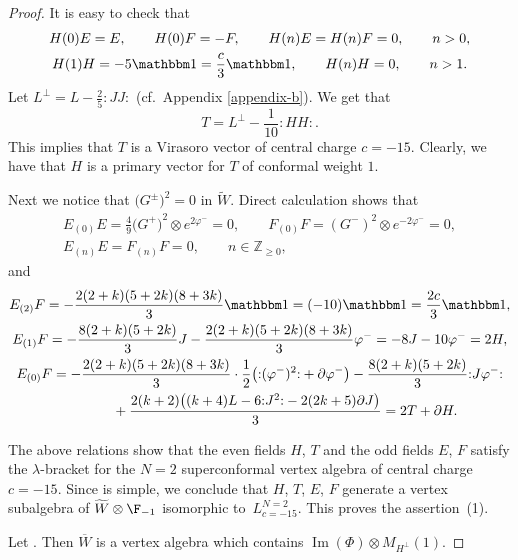 \begin{proof}


It is easy to check that
\begin{gather*}
 H(0) E = E, \qquad H(0) F =-F, \qquad H(n) E = H(n) F =0, \qquad n >0, \\
 H(1) H = - 5 {\mathbbm 1} = \frac{c}{3} {\mathbbm 1},\qquad H(n) H =0, \qquad n >1.
\end{gather*}
 Let $L^{\perp} = L- \frac{2}{5} {:}J J{:}$ (cf.\ Appendix \ref{appendix-b}). We get that
\[
 T = L^{\perp} -\frac{1}{10} {:}H H{:}.
 \]
This implies that $T$ is a Virasoro vector of central charge $c=-15$. Clearly, we have that $H$ is a primary vector for $T$ of conformal weight $1$.


 Next we notice that $\bigl(G^\pm \bigr)^2 =0$ in $\widetilde W$. Direct calculation shows that
 \begin{gather*}
 E_{(0)} E = \frac{4}{9} {\bigl( G^+ \bigr)}^2 \otimes e^{2 \varphi^-} =0, \qquad F_{(0)}F = {( G^-)}^2 \otimes e^{-2 \varphi^-} =0, \\
 E_{(n)} E = F_{(n)} F =0, \qquad n\in {\mathbb Z}_{\ge 0},
\end{gather*}
and
\begin{gather*}
	E_{(2)} F = -\frac{2 (2 + k)(5 + 2k)(8 + 3k)}{3} {\mathbbm 1} =(-10) {\mathbbm 1} = \frac{2 c}{3} {\mathbbm 1}, \\
E_{(1)} F = -\frac{ 8(2 + k)(5 + 2k)}{3} J - \frac{2 (2 + k)(5 + 2k)(8 + 3k)}{3} \varphi^- = -8 J - 10 \varphi^- = 2 H, \\
 E_{(0)} F = - \frac{2 (2 + k)(5 + 2k)(8 + 3k)}{3}\cdot\frac{1}{2}\bigl({:}( \varphi^-)^2{:}+\partial\varphi^-\bigr)-\frac{ 8(2 + k)(5 + 2k)}{3} {:}J \varphi^-{:} \\
 \phantom{E_{(0)} F =}{}+\frac{2(k+2) \bigl((k+4)L-6{:}J^2{:}-2(2k+5) \partial J\bigr)}{3} = 2T + \partial H.
\end{gather*}

The above relations show that the even fields $H$, $ T$ and the odd fields $E$, $F$ satisfy the $\lambda$-bracket for the $N=2$ superconformal vertex algebra of central charge $c=-15$. Since  is simple, we conclude that $H$, $T$, $E$, $F$ generate a vertex subalgebra of $\widetilde W \otimes \F_{-1}$ isomorphic to~$L^{N=2}_{c=-15}$. This proves the assertion~(1).

 Let . Then $\overline{W}$ is a vertex algebra which contains $ \operatorname{Im} (\Phi)\otimes M_{H^{\perp}} (1)$.




\end{proof}
